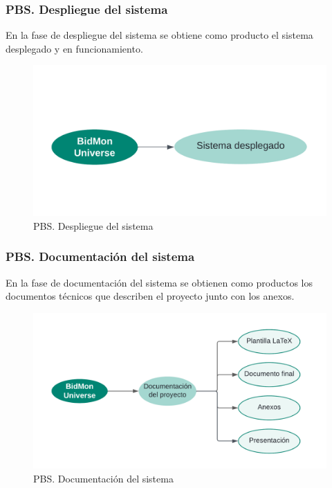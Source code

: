 \subsubsection{PBS. Despliegue del sistema}
En la fase de despliegue del sistema se obtiene como producto el sistema desplegado y en funcionamiento.
\begin{figure}[H]
    \hypertarget{fig:5_PBS-Despliegue-Sistema}{}
    \centering
    \includegraphics[width=0.7\linewidth]{figures/5-PBS/5_PBS-Despliegue.png}
    \caption{PBS. Despliegue del sistema}
    \label{fig:5_PBS-Despliegue-Sistema}
\end{figure}


\subsubsection{PBS. Documentación del sistema}
En la fase de documentación del sistema se obtienen como productos los documentos técnicos que describen el proyecto junto con los anexos.
\begin{figure}[H]
    \hypertarget{fig:5_PBS-Documentación-Sistema}{}
    \centering
    \includegraphics[width=0.7\linewidth]{figures/5-PBS/5_PBS-Documentacion.png}
    \caption{PBS. Documentación del sistema}
    \label{fig:5_PBS-Documentación-Sistema}
\end{figure}


